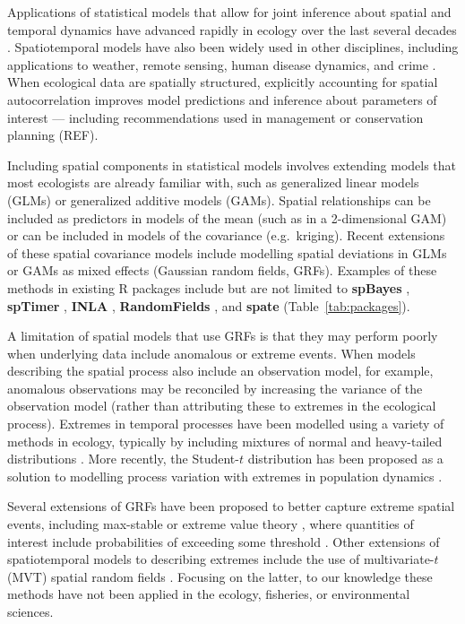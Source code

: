 \documentclass[12pt,english]{article}
\begin{document}
\begin{spacing}{1.9}

Applications of statistical models that allow for joint inference about spatial
and temporal dynamics have advanced rapidly in ecology over the last several
decades \citep[e.g.][]{bascompte1995, latimer2009}. Spatiotemporal models have
also been widely used in other disciplines, including applications to weather,
remote sensing, human disease dynamics, and crime \citep{cressie2011}. When
ecological data are spatially structured, explicitly accounting for spatial
autocorrelation improves model predictions and inference about parameters of
interest --- including recommendations used in management or conservation
planning (REF).

Including spatial components in statistical models involves extending models
that most ecologists are already familiar with, such as generalized linear
models (GLMs) or generalized additive models (GAMs). Spatial relationships can
be included as predictors in models of the mean (such as in a 2-dimensional
GAM) or can be included in models of the covariance (e.g.\ kriging). Recent
extensions of these spatial covariance models include modelling spatial
deviations in GLMs or GAMs as mixed effects (Gaussian random
fields, GRFs). Examples of these methods in existing R packages include but are not
limited to \textbf{spBayes} \citep{finley2007}, \textbf{spTimer}
\citep{bakar2015}, \textbf{INLA} \citep{rue2009}, \textbf{RandomFields}
\citep{schlather2016}, and \textbf{spate} \citep{sigrist2015}
(Table~\ref{tab:packages}).

A limitation of spatial models that use GRFs is that they
may perform poorly when underlying data include anomalous or extreme events.
When models describing the spatial process also include an observation model,
for example, anomalous observations may be reconciled by increasing the variance
of the observation model (rather than attributing these to extremes in the
ecological process). Extremes in temporal processes have been modelled using a
variety of methods in ecology, typically by including mixtures of normal and
heavy-tailed distributions \citep[e.g.][]{everitt1996, ward2007, thorson2011}.
More recently, the Student-$t$ distribution has been proposed as a
solution to modelling process variation with extremes in population dynamics
\citep{anderson2017}.

Several extensions of GRFs have been proposed to better capture
extreme spatial events, including max-stable or extreme value theory
\citep{davison2012, davison2012a}, where quantities of interest include probabilities
of exceeding some threshold \citep{davis2008}. Other extensions of spatiotemporal
models to describing extremes include the use of multivariate-$t$ (MVT) spatial
random fields \citep{roislien2007}. Focusing on the latter, to our knowledge these
methods have not been applied in the ecology, fisheries, or environmental sciences.


\end{spacing}
\end{document}
